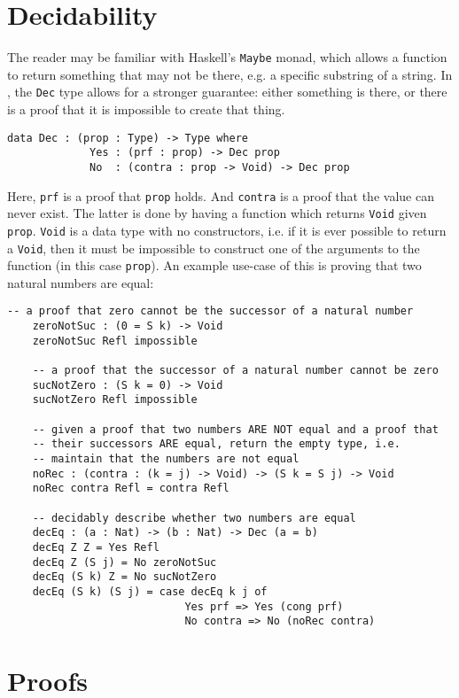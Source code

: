 \section{Decidability}
	The reader may be familiar with Haskell's \texttt{Maybe} monad, which allows a function to return something that may not be there, e.g. a specific substring of a string. In \Idris, the \texttt{Dec} type allows for a stronger guarantee: either something is there, or there is a proof that it is impossible to create that thing.
	\begin{lstlisting}[caption={\texttt{Dec} as defined in the \Idris prelude \cite{brady_2017}}]
        data Dec : (prop : Type) -> Type where
             Yes : (prf : prop) -> Dec prop
             No  : (contra : prop -> Void) -> Dec prop
	\end{lstlisting}
    Here, \texttt{prf} is a proof that \texttt{prop} holds. And \texttt{contra} is a proof that the value can never exist. The latter is done by having a function which returns \texttt{Void} given \texttt{prop}. \texttt{Void} is a data type with no constructors, i.e. if it is ever possible to return a \texttt{Void}, then it must be impossible to construct one of the arguments to the function (in this case \texttt{prop}). An example use-case of this is proving that two natural numbers are equal:
	\begin{lstlisting}[caption={Proving the equality between natural numbers \cite{brady_2017}}]
    -- a proof that zero cannot be the successor of a natural number
    zeroNotSuc : (0 = S k) -> Void
    zeroNotSuc Refl impossible
    
    -- a proof that the successor of a natural number cannot be zero
    sucNotZero : (S k = 0) -> Void
    sucNotZero Refl impossible
    
    -- given a proof that two numbers ARE NOT equal and a proof that
    -- their successors ARE equal, return the empty type, i.e.
    -- maintain that the numbers are not equal
    noRec : (contra : (k = j) -> Void) -> (S k = S j) -> Void
    noRec contra Refl = contra Refl

    -- decidably describe whether two numbers are equal
    decEq : (a : Nat) -> (b : Nat) -> Dec (a = b)
    decEq Z Z = Yes Refl
    decEq Z (S j) = No zeroNotSuc
    decEq (S k) Z = No sucNotZero
    decEq (S k) (S j) = case decEq k j of
                            Yes prf => Yes (cong prf)
                            No contra => No (noRec contra)
	\end{lstlisting}

\section{Proofs}
